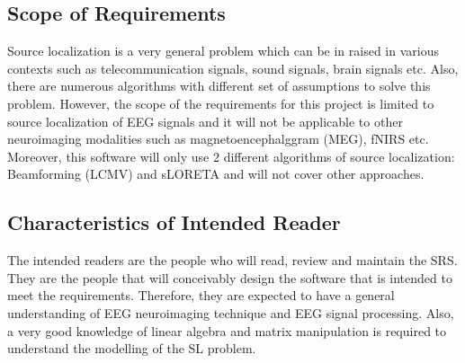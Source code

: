\documentclass[12pt]{article}
\begin{document}
\subsection{Scope of Requirements} 

Source localization is a very general problem which can be in raised in various contexts such as telecommunication signals, sound signals, brain signals etc. Also, there are numerous algorithms with different set of assumptions to solve this problem. However, the scope of the requirements for this project is limited to source localization of EEG signals and it will not be applicable to other neuroimaging modalities such as magnetoencephalggram (MEG), fNIRS etc. Moreover, this software will only use 2 different algorithms of source localization: Beamforming (LCMV) and sLORETA and will not cover other approaches.



\subsection{Characteristics of Intended Reader} \label{sec_IntendedReader}

The intended readers are the people who will read, review and maintain the SRS.  They are the people that will conceivably design the software that is intended to meet the requirements. Therefore, they are expected to have a general understanding of EEG neuroimaging technique and EEG signal processing. Also, a very good knowledge of linear algebra and matrix manipulation is required to understand the modelling of the SL problem. 
\end{document}
